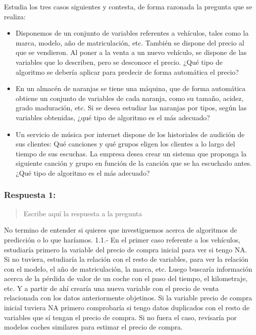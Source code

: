 \documentclass[]{article}
\begin{document}
Estudia los tres casos siguientes y contesta, de forma razonada la
pregunta que se realiza:

\begin{itemize}
\item
  Disponemos de un conjunto de variables referentes a vehículos, tales
  como la marca, modelo, año de matriculación, etc. También se dispone
  del precio al que se vendieron. Al poner a la venta a un nuevo
  vehículo, se dispone de las variables que lo describen, pero se
  desconoce el precio. ¿Qué tipo de algoritmo se debería aplicar para
  predecir de forma automática el precio?
\item
  En un almacén de naranjas se tiene una máquina, que de forma
  automática obtiene un conjunto de variables de cada naranja, como su
  tamaño, acidez, grado maduración, etc. Si se desea estudiar las
  naranjas por tipos, según las variables obtenidas, ¿qué tipo de
  algoritmo es el más adecuado?
\item
  Un servicio de música por internet dispone de los historiales de
  audición de sus clientes: Qué canciones y qué grupos eligen los
  clientes a lo largo del tiempo de sus escuchas. La empresa desea crear
  un sistema que proponga la siguiente canción y grupo en función de la
  canción que se ha escuchado antes. ¿Qué tipo de algoritmo es el más
  adecuado?
\end{itemize}

\hypertarget{respuesta-1}{%
\subsubsection{Respuesta 1:}\label{respuesta-1}}

\begin{quote}
Escribe aquí la respuesta a la pregunta
\end{quote}

No termino de entender si quieres que investiguemos acerca de algoritmos
de predicción o lo que haríamos. 1.1.- En el primer caso referente a los
vehículos, estudiaría primero la variable del precio de compra inicial
para ver si tengo NA. Si no tuviera, estudiaría la relación con el resto
de variables, para ver la relación con el modelo, el año de
matriculación, la marca, etc. Luego buscaría información acerca de la
pérdida de valor de un coche con el paso del tiempo, el kilometraje,
etc. Y a partir de ahí crearía una nueva variable con el precio de venta
relacionada con los datos anteriormente objetinos. Si la variable precio
de compra inicial tuviera NA primero comprobaría si tengo datos
duplicados con el resto de variables que sí tengan el precio de compra.
Si no fuera el caso, revisaría por modelos coches similares para estimar
el precio de compra.
\end{document}
